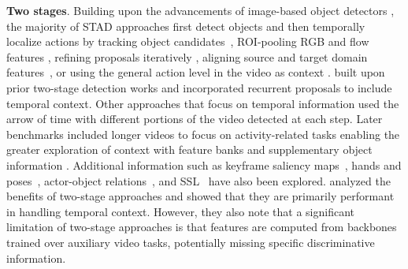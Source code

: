 
\noindent
\textbf{Two stages}. Building upon the advancements of image-based object detectors \citep{girshick2014rich,girshick2015fast}, the majority of STAD approaches first detect objects and then temporally localize actions by tracking object candidates~\citep{jain2014action,weinzaepfel2015learning}, ROI-pooling RGB and flow features \citep{peng2016multi}, refining proposals iteratively \citep{soomro2015action}, aligning source and target domain features~\citep{agarwal2020unsupervised}, or using the general action level in the video as context \citep{mettes2016spot}. \citet{li2018recurrent} built upon prior two-stage detection works and incorporated recurrent proposals to include temporal context. Other approaches that focus on temporal information \citet{singh2017online} used the arrow of time with different portions of the video detected at each step. Later benchmarks included longer videos to focus on activity-related tasks \citep{gu2018ava} enabling the greater exploration of context with feature banks \citep{feng2021relation,pan2021actor,tang2020asynchronous,wang2018videos,wu2019long,wu2022memvit} and supplementary object information \citep{arnab2021unified,hou2017tube,zhang2019structured}. Additional information such as keyframe saliency maps~\citep{li2020actions,ulutan2020actor}, hands and poses~\citep{faure2023holistic}, actor-object relations~\citep{sun2018actor}, and SSL~\citep{wang2023videomae} have also been explored. \citet{alwassel2018diagnosing} analyzed the benefits of two-stage approaches and showed that they are primarily performant in handling temporal context. However, they also note that a significant limitation of two-stage approaches is that features are computed from backbones trained over auxiliary video tasks, potentially missing specific discriminative information.




